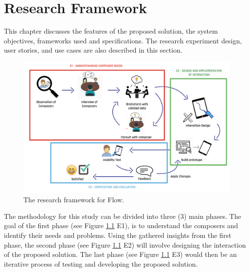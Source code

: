%
%
%                 

\chapter{Research Framework}

	This chapter discusses the features of the proposed solution, the system objectives, frameworks used and specifications. The research experiment design, user stories, and use cases are also described in this section. 

	\begin{figure}[H]
		\centering
		\includegraphics[scale=0.42]{figures/research_framework_sectioned.png}
	    \caption{The research framework for Flow.}
	    \label{fig:research_framework}
	\end{figure}

	The methodology for this study can be divided into three (3) main phases. The goal of the first phase (see Figure \ref{fig:research_framework} E1), is to understand the composers and identify their needs and problems. Using the gathered insights from the first phase, the second phase (see Figure \ref{fig:research_framework} E2)  will involve designing the interaction of the proposed solution. The last phase (see Figure \ref{fig:research_framework} E3) would then be an iterative process of testing and developing the proposed solution.


